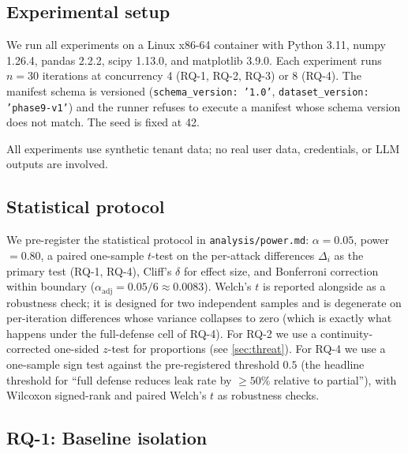 \documentclass[sigconf, anonymous, natbib=false]{acmart}
\begin{document}
\subsection{Experimental setup}

We run all experiments on a Linux x86-64 container with
Python 3.11, numpy 1.26.4, pandas 2.2.2, scipy 1.13.0, and
matplotlib 3.9.0. Each experiment runs $n = 30$ iterations
at concurrency 4 (RQ-1, RQ-2, RQ-3) or 8 (RQ-4). The
manifest schema is versioned
(\texttt{schema\_version: '1.0'},
\texttt{dataset\_version: 'phase9-v1'}) and the runner
refuses to execute a manifest whose schema version does
not match. The seed is fixed at 42.

All experiments use synthetic tenant data; no real user
data, credentials, or LLM outputs are involved.

\subsection{Statistical protocol}

We pre-register the statistical protocol in
\texttt{analysis/power.md}: $\alpha = 0.05$, power $= 0.80$,
a paired one-sample $t$-test on the per-attack differences
$\Delta_i$ as the primary test (RQ-1, RQ-4), Cliff's
$\delta$ for effect size, and Bonferroni correction within
boundary ($\alpha_{\text{adj}} = 0.05 / 6 \approx 0.0083$).
Welch's $t$ is reported alongside as a robustness check; it
is designed for two independent samples and is degenerate
on per-iteration differences whose variance collapses to
zero (which is exactly what happens under the
full-defense cell of RQ-4). For RQ-2 we use a
continuity-corrected one-sided $z$-test for proportions
(see \cref{sec:threat}). For RQ-4 we use a one-sample sign
test against the pre-registered threshold $0.5$ (the
headline threshold for ``full defense reduces leak rate
by $\geq 50\%$ relative to partial''), with Wilcoxon
signed-rank and paired Welch's $t$ as robustness checks.

\subsection{RQ-1: Baseline isolation}
\end{document}
